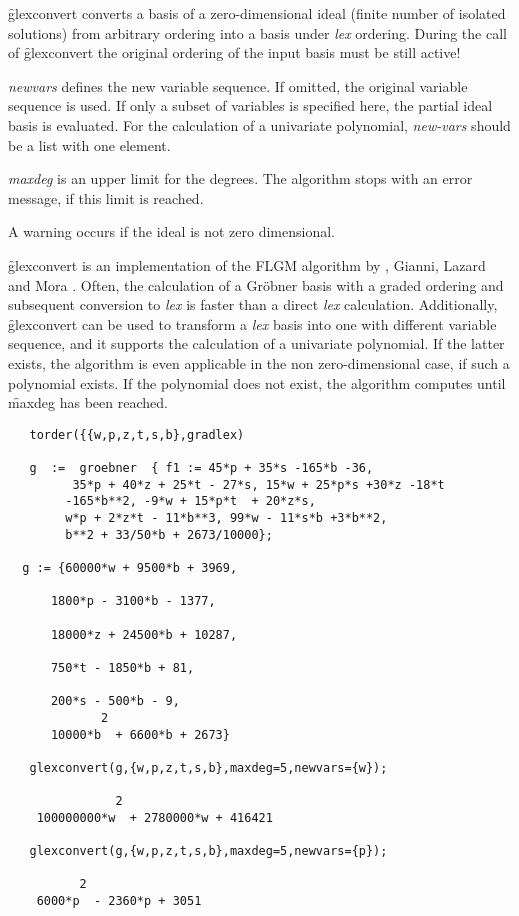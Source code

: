 \f{glexconvert} converts a basis of a zero-dimensional ideal (finite number
of isolated solutions) from arbitrary ordering into a basis under \textit{lex}
ordering. During the call of \f{glexconvert} the original ordering of
the input basis must be still active!

\emph{newvars} defines the new variable sequence. If omitted, the
original variable sequence is used. If only a subset of variables is
specified here, the partial ideal basis is evaluated. For the
calculation of a univariate polynomial, \emph{new-vars} should be a list
with one element.

\emph{maxdeg} is an upper limit for the degrees. The algorithm stops with
an error message, if this limit is reached.

A warning occurs if the ideal is not zero dimensional.

\f{glexconvert} is an implementation of the FLGM algorithm by
, {\sc Gianni}, {\sc Lazard} and {\sc
Mora} \cite{Faugere:93}. Often, the calculation of a Gr\"obner basis
with a graded ordering and subsequent conversion to {\it lex} is
faster than a direct {\it lex} calculation. Additionally, \f{glexconvert}
can be used to transform a {\it lex} basis into one with different
variable sequence, and it supports the calculation of a univariate
polynomial. If the latter exists, the algorithm is even applicable in
the non zero-dimensional case, if such a polynomial exists.
If the polynomial does not exist, the algorithm computes  until \f{maxdeg}
has been reached.
\begin{verbatim}
   torder({{w,p,z,t,s,b},gradlex)

   g  :=  groebner  { f1 := 45*p + 35*s -165*b -36,
         35*p + 40*z + 25*t - 27*s, 15*w + 25*p*s +30*z -18*t
        -165*b**2, -9*w + 15*p*t  + 20*z*s,
        w*p + 2*z*t - 11*b**3, 99*w - 11*s*b +3*b**2,
        b**2 + 33/50*b + 2673/10000};

  g := {60000*w + 9500*b + 3969,

      1800*p - 3100*b - 1377,

      18000*z + 24500*b + 10287,

      750*t - 1850*b + 81,

      200*s - 500*b - 9,
             2
      10000*b  + 6600*b + 2673}

   glexconvert(g,{w,p,z,t,s,b},maxdeg=5,newvars={w});

               2
    100000000*w  + 2780000*w + 416421

   glexconvert(g,{w,p,z,t,s,b},maxdeg=5,newvars={p});

          2
    6000*p  - 2360*p + 3051
\end{verbatim}

